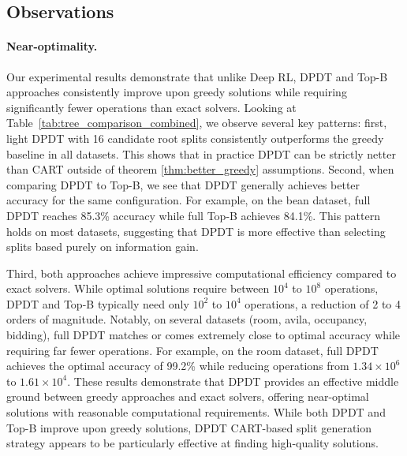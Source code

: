 \subsection{Observations}

\paragraph{Near-optimality.} Our experimental results demonstrate that unlike Deep RL, DPDT and Top-B approaches consistently improve upon greedy solutions while requiring significantly fewer operations than exact solvers. Looking at Table~\ref{tab:tree_comparison_combined}, we observe several key patterns:
first, light DPDT with 16 candidate root splits consistently outperforms the greedy baseline in all datasets. This shows that in practice DPDT can be strictly netter than CART outside of theorem \ref{thm:better_greedy} assumptions. 
Second, when comparing DPDT to Top-B, we see that DPDT generally achieves better accuracy for the same configuration. For example, on the bean dataset, full DPDT reaches 85.3\% accuracy while full Top-B achieves 84.1\%. This pattern holds on most datasets, suggesting that DPDT is more effective than selecting splits based purely on information gain.


Third, both approaches achieve impressive computational efficiency compared to exact solvers. While optimal solutions require between $10^4$ to $10^8$ operations, DPDT and Top-B typically need only $10^2$ to $10^4$ operations, a reduction of 2 to 4 orders of magnitude.
Notably, on several datasets (room, avila, occupancy, bidding), full DPDT matches or comes extremely close to optimal accuracy while requiring far fewer operations. For example, on the room dataset, full DPDT achieves the optimal accuracy of 99.2\% while reducing operations from $1.34\times10^6$ to $1.61\times10^4$.
These results demonstrate that DPDT provides an effective middle ground between greedy approaches and exact solvers, offering near-optimal solutions with reasonable computational requirements. While both DPDT and Top-B improve upon greedy solutions, DPDT CART-based split generation strategy appears to be particularly effective at finding high-quality solutions.

